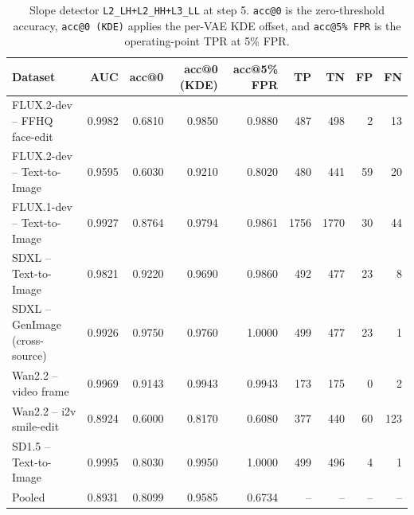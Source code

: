 \begin{table}[t]
\centering
\small
\setlength{\tabcolsep}{5pt}
\begin{tabular}{lrrrrrrrr}
\toprule
Dataset & AUC & acc@0 & acc@0 (KDE) & acc@5\% FPR & TP & TN & FP & FN \\
\midrule
FLUX.2-dev -- FFHQ face-edit          & 0.9982 & 0.6810 & 0.9850 & 0.9880 & 487 & 498 & 2 & 13 \\
FLUX.2-dev -- Text-to-Image           & 0.9595 & 0.6030 & 0.9210 & 0.8020 & 480 & 441 & 59 & 20 \\
FLUX.1-dev -- Text-to-Image           & 0.9927 & 0.8764 & 0.9794 & 0.9861 & 1756 & 1770 & 30 & 44 \\
SDXL -- Text-to-Image                 & 0.9821 & 0.9220 & 0.9690 & 0.9860 & 492 & 477 & 23 & 8 \\
SDXL -- GenImage (cross-source)       & 0.9926 & 0.9750 & 0.9760 & 1.0000 & 499 & 477 & 23 & 1 \\
Wan2.2 -- video frame                 & 0.9969 & 0.9143 & 0.9943 & 0.9943 & 173 & 175 & 0 & 2 \\
Wan2.2 -- i2v smile-edit              & 0.8924 & 0.6000 & 0.8170 & 0.6080 & 377 & 440 & 60 & 123 \\
SD1.5 -- Text-to-Image                & 0.9995 & 0.8030 & 0.9950 & 1.0000 & 499 & 496 & 4 & 1 \\
\midrule
Pooled                                & 0.8931 & 0.8099 & 0.9585 & 0.6734 & -- & -- & -- & -- \\
\bottomrule
\end{tabular}
\caption{Slope detector \texttt{L2\_LH+L2\_HH+L3\_LL} at step 5. \texttt{acc@0} is the zero-threshold accuracy, \texttt{acc@0 (KDE)} applies the per-VAE KDE offset, and \texttt{acc@5\% FPR} is the operating-point TPR at 5\% FPR.}
\end{table}

